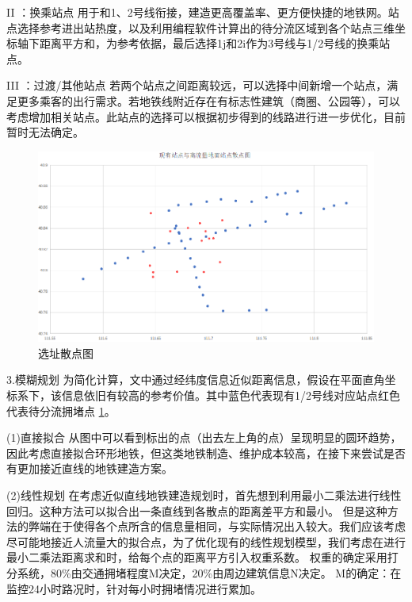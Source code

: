\documentclass[12pt,a4paper]{mcmthesis}
\begin{document}
    II ：换乘站点
    用于和1、2号线衔接，建造更高覆盖率、更方便快捷的地铁网。站点选择参考进出站热度，以及利用编程软件计算出的待分流区域到各个站点三维坐标轴下距离平方和，为参考依据，最后选择1j和2i作为3号线与1/2号线的换乘站点。

    III ：过渡/其他站点
    若两个站点之间距离较远，可以选择中间新增一个站点，满足更多乘客的出行需求。若地铁线附近存在有标志性建筑（商圈、公园等），可以考虑增加相关站点。此站点的选择可以根据初步得到的线路进行进一步优化，目前暂时无法确定。


    \begin{figure}[h!t]
        \centerline{\includegraphics[scale=0.6]{figures/选址散点图}\quad}
        \caption{\song\wuhao 选址散点图}
        \label{fig:选址散点图}
    \end{figure}

    3.模糊规划
    为简化计算，文中通过经纬度信息近似距离信息，假设在平面直角坐标系下，该信息依旧有较高的参考价值。其中蓝色代表现有1/2号线对应站点红色代表待分流拥堵点 \ref{fig:选址散点图}。

    (1)直接拟合
    从图中可以看到标出的点（出去左上角的点）呈现明显的圆环趋势，因此考虑直接拟合环形地铁，但这类地铁制造、维护成本较高，在接下来尝试是否有更加接近直线的地铁建造方案。

    (2)线性规划
    在考虑近似直线地铁建造规划时，首先想到利用最小二乘法进行线性回归。这种方法可以拟合出一条直线到各散点的距离差平方和最小。
    但是这种方法的弊端在于使得各个点所含的信息量相同，与实际情况出入较大。我们应该考虑尽可能地接近人流量大的拟合点，为了优化现有的线性规划模型，我们考虑在进行最小二乘法距离求和时，给每个点的距离平方引入权重系数。
    权重的确定采用打分系统，80\%由交通拥堵程度M决定，20\%由周边建筑信息N决定。
    M的确定：在监控24小时路况时，针对每小时拥堵情况进行累加。
\end{document}
